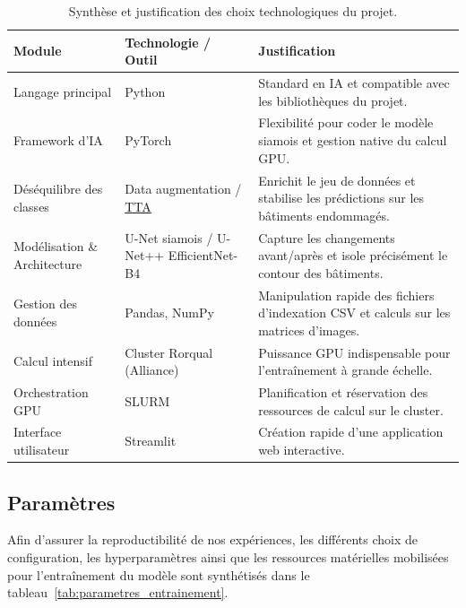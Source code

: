 \documentclass[french,12pt]{article}
\begin{document}
\begin{table}[H]
    \centering
    \begin{tabular}{|>{\centering\arraybackslash}m{3.2cm}|>{\centering\arraybackslash}m{3.8cm}|>{\centering\arraybackslash}m{6.5cm}|}
        \hline
        \textbf{Module} & \textbf{Technologie / Outil} & \textbf{Justification} \\
        \hline
        Langage principal & Python & Standard en IA et compatible avec les bibliothèques du projet. \\ \hline
        Framework d'IA & PyTorch \cite{pytorch} & Flexibilité pour coder le modèle siamois et gestion native du calcul GPU. \\ \hline
        Déséquilibre des classes & Data augmentation / \hyperref[subsec:tta]{TTA} & Enrichit le jeu de données et stabilise les prédictions sur les bâtiments endommagés. \\ \hline
        Modélisation \& Architecture & U-Net siamois / U-Net++ EfficientNet-B4 \cite{unet,unetplusplus} & Capture les changements avant/après et isole précisément le contour des bâtiments. \\ \hline
        Gestion des données & Pandas, NumPy & Manipulation rapide des fichiers d'indexation CSV et calculs sur les matrices d'images. \\ \hline
        Calcul intensif & Cluster Rorqual (Alliance) & Puissance GPU indispensable pour l'entraînement à grande échelle. \\ \hline
        Orchestration GPU & SLURM \cite{slurm} & Planification et réservation des ressources de calcul sur le cluster. \\ \hline
        Interface utilisateur & Streamlit \cite{streamlit} & Création rapide d'une application web interactive. \\ \hline
    \end{tabular}
    \caption{Synthèse et justification des choix technologiques du projet.}
    \label{tab:technos}
\end{table}

\subsection{Paramètres}

Afin d'assurer la reproductibilité de nos expériences, les différents choix de configuration, les hyperparamètres ainsi que les ressources matérielles mobilisées pour l'entraînement du modèle sont synthétisés dans le tableau~\ref{tab:parametres_entrainement}.
\end{document}
